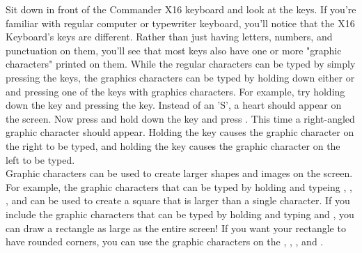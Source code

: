 Sit down in front of the Commander X16 keyboard and look at the keys.  If
you're familiar with regular computer or typewriter keyboard, you'll notice
that the X16 Keyboard's keys are different.  Rather than just having letters,
numbers, and punctuation on them, you'll see that most keys also have one or
more "graphic characters" printed on them.  While the regular characters can be
typed by simply pressing the keys, the graphics characters can be typed by
holding down either \shiftkey or \altkey and pressing one of the keys with
graphics characters.  For example, try holding down the \shiftkey key and
pressing the  key.  Instead of an 'S', a heart
should appear on the screen.  Now press and hold down the \altkey key and press
.  This time a right-angled graphic character should appear.  Holding
the \shiftkey key causes the graphic character on the right to be typed, and
holding the \altkey key causes the graphic character on the left to be typed.\\

Graphic characters can be used to create larger shapes and images on the
screen.  For example, the graphic characters that can be typed by holding
\altkey and typeing , , , and  can be used to
create a square that is larger than a single character.  If you include the
graphic characters that can be typed by holding \shiftkey and typing 
and , you can draw a rectangle as large as the entire screen!  If you
want your rectangle to have rounded corners, you can use the graphic characters
on the , , , and .\\


% 
% 


